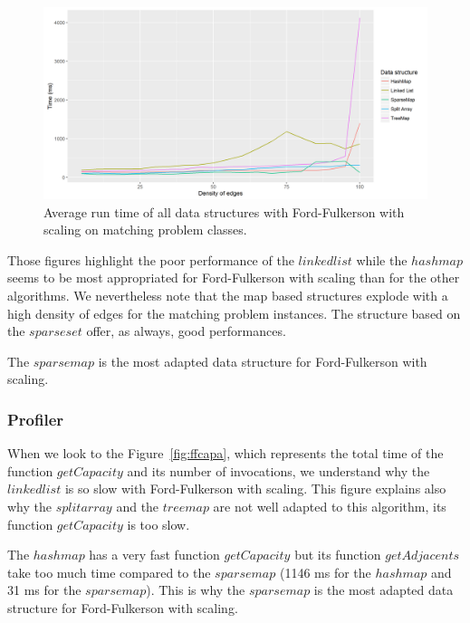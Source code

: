 \begin{figure}[H]
\begin{center}
\includegraphics[scale=0.55]{images/results/ffmeanmatching.png}
\caption{Average run time of all data structures with Ford-Fulkerson with scaling on matching problem classes.}
\label{fig:ffmeanmatching}
\end{center}
\end{figure}


Those figures highlight the poor performance of the $linked list$ while the $hash map$ seems to be most appropriated for Ford-Fulkerson with scaling than for the other algorithms. We nevertheless note that the map based structures explode with a high density of edges for the matching problem instances. The structure based on the $sparse set$ offer, as always, good performances. 

The $sparse map$ is the most adapted data structure for Ford-Fulkerson with scaling.

\subsubsection{Profiler}

When we look to the Figure~\ref{fig:ffcapa}, which represents the total time of the function $getCapacity$ and its number of invocations, we understand why the $linkedlist$ is so slow with Ford-Fulkerson with scaling. This figure explains also why the $split array$ and the $treemap$ are not well adapted to this algorithm, its function $getCapacity$ is too slow.

The $hashmap$ has a very fast function $getCapacity$ but its function $getAdjacents$ take too much time compared to the $sparsemap$ (1146 ms for the $hashmap$ and 31 ms for the $sparsemap$). This is why the $sparse map$ is the most adapted data structure for Ford-Fulkerson with scaling.

